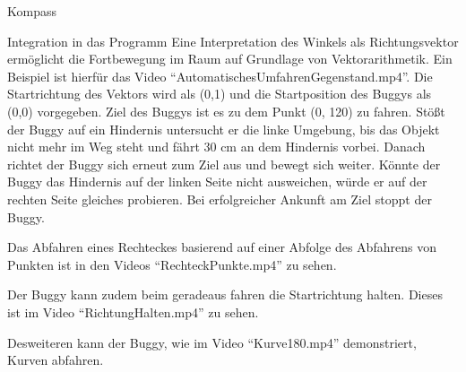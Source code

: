 \documentclass[12pt]{report}
\begin{document}
\begin{section}{Kompass}
\begin{subsection}{Integration in das Programm}
    Eine Interpretation des Winkels als Richtungsvektor ermöglicht die
    Fortbewegung im Raum auf Grundlage von Vektorarithmetik.
    Ein Beispiel ist hierfür das Video ``AutomatischesUmfahrenGegenstand.mp4''.
    Die Startrichtung des Vektors wird als (0,1) und die Startposition des
    Buggys als (0,0) vorgegeben. Ziel des Buggys ist es zu dem Punkt (0, 120) zu fahren.
    Stößt der Buggy auf ein Hindernis untersucht er die linke Umgebung, bis das
    Objekt nicht mehr im Weg steht und fährt 30 cm an dem Hindernis vorbei.
    Danach richtet der Buggy sich erneut zum Ziel aus und bewegt sich weiter.
    Könnte der Buggy das Hindernis auf der linken Seite nicht ausweichen, würde
    er auf der rechten Seite gleiches probieren.
    Bei erfolgreicher Ankunft am Ziel stoppt der Buggy.

    Das Abfahren eines Rechteckes basierend auf einer Abfolge des Abfahrens von
    Punkten ist in den Videos ``RechteckPunkte.mp4'' zu sehen.

    Der Buggy kann zudem beim geradeaus fahren die Startrichtung halten. Dieses
    ist im Video ``RichtungHalten.mp4'' zu sehen. 

    Desweiteren kann der Buggy, wie im Video ``Kurve180.mp4'' demonstriert,
    Kurven abfahren.
  \end{subsection}
\end{section}
\end{document}
